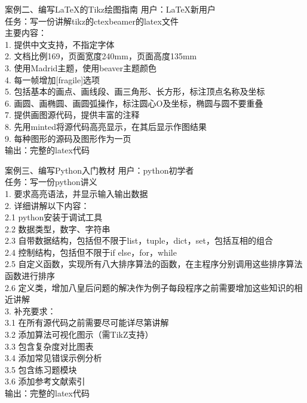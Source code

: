 \documentclass{ctexbeamer}
\begin{document}
\begin{frame}[t]{案例二、编写LaTeX的Tikz绘图指南}
\fontsize{12pt}{14pt}\selectfont
\alert{用户：LaTeX新用户}\\
\alert{任务：写一份讲解tikz的ctexbeamer的latex文件}\\
主要内容：\\
1. 提供中文支持，不指定字体\\
2. 文档比例169，页面宽度240mm，页面高度135mm\\
3. 使用Madrid主题，使用beaver主题颜色\\
4. 每一帧增加[fragile]选项\\
5. 包括基本的画点、画线段、画三角形、长方形，标注顶点名称及坐标\\
6. 画圆、画椭圆、画圆弧操作，标注圆心O及坐标，椭圆与圆不要重叠\\
7. 提供画图源代码，提供丰富的注释\\
8. 先用minted将源代码高亮显示，在其后显示作图结果\\
9. 每种图形的源码及图形作为一页\\
\alert{输出：完整的latex代码}
\end{frame}

\begin{frame}[t]{案例三、编写Python入门教材}
\fontsize{9pt}{11pt}\selectfont
\alert{用户：python初学者}\\
\alert{任务：写一份python讲义}\\
1. 要求高亮语法，并显示输入输出数据\\
2. 详细讲解以下内容：\\
2.1 python安装于调试工具\\
2.2 数据类型，数字、字符串\\
2.3 自带数据结构，包括但不限于list，tuple，dict，set，包括互相的组合\\
2.4 控制结构，包括但不限于if else，for，while\\
2.5 自定义函数，实现所有八大排序算法的函数，在主程序分别调用这些排序算法函数进行排序\\
2.6 定义类，增加八皇后问题的解决作为例子每段程序之前需要增加这些知识的相近讲解\\
3. 补充要求：\\
3.1 在所有源代码之前需要尽可能详尽第讲解\\
3.2 添加算法可视化图示（需TikZ支持）\\
3.3 包含复杂度对比图表\\
3.4 添加常见错误示例分析\\
3.5 包含练习题模块\\
3.6 添加参考文献索引\\
\alert{输出：完整的latex代码}
\end{frame}
\end{document}
